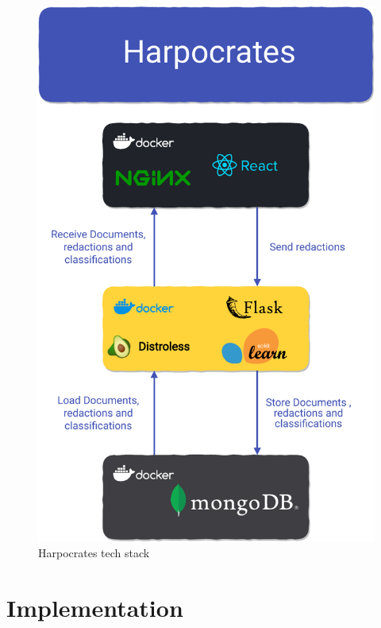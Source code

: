 \documentclass{l4proj}
\begin{document}
\begin{figure}
    \includegraphics[width=\linewidth]{figures/tech_stack_no_background.pdf}
    \caption{Harpocrates tech stack}
    \label{fig:tech_stack}
\end{figure}

\chapter{Implementation}


\end{document}
